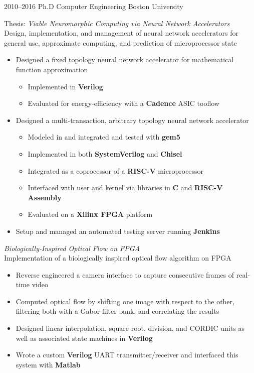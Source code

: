 \documentclass[print]{friggeri-cv} %
\begin{document}
\begin{entrylist}


\entry
{2010--2016}
{Ph.D {\normalfont Computer Engineering}}
{Boston University}
{Thesis: \emph{Viable Neuromorphic Computing via Neural Network Accelerators} \\
  Design, implementation, and management of neural network accelerators for general use, approximate computing, and prediction of microprocessor state
  \begin{itemize}
  \item Designed a fixed topology neural network accelerator for mathematical function approximation
    \begin{itemize}
    \item Implemented in \textbf{Verilog}
    \item Evaluated for energy-efficiency with a \textbf{Cadence} ASIC tooflow
    \end{itemize}
  \item Designed a multi-transaction, arbitrary topology neural network accelerator
    \begin{itemize}
    \item Modeled in \textbf{\CPP} and integrated and tested with \textbf{gem5}
    \item Implemented in both \textbf{SystemVerilog} and \textbf{Chisel}
    \item Integrated as a coprocessor of a \textbf{RISC-V} microprocessor
    \item Interfaced with user and kernel via libraries in \textbf{C} and \textbf{RISC-V Assembly}
    \item Evaluated on a \textbf{Xilinx FPGA} platform
    \end{itemize}
  \item Setup and managed an automated testing server running \textbf{Jenkins}
  \end{itemize}
  \emph{Biologically-Inspired Optical Flow on FPGA} \\
  Implementation of a biologically inspired optical flow algorithm on FPGA
  \begin{itemize}
  \item Reverse engineered a camera interface to capture consecutive frames of real-time video
  \item Computed optical flow by shifting one image with respect to the other, filtering both with a Gabor filter bank, and correlating the results
  \item Designed linear interpolation, square root, division, and CORDIC units as well as associated state machines in \textbf{Verilog}
  \item Wrote a custom \textbf{Verilog} UART transmitter/receiver and interfaced this system with \textbf{Matlab}
  \end{itemize}
}


\end{entrylist}
\end{document}
